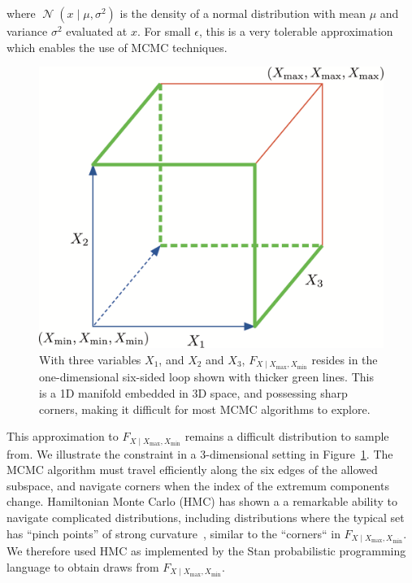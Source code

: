 \documentclass[letter]{article}
\makeatletter
\def\maxwidth{\ifdim\Gin@nat@width>\linewidth\linewidth
\else\Gin@nat@width\fi}
\let\Oldincludegraphics\includegraphics
\renewcommand{\includegraphics}[1]{\Oldincludegraphics[width=.8\maxwidth]{#1}}
\newcommand{\genericdel}[3]{%
      \left#1#3\right#2
    }
\newcommand{\del}[1]{\genericdel(){#1}}
\DeclareMathOperator{\normal}{\mathcal{N}}
\newcommand{\Xmax}{X_{\max}}
\newcommand{\Xmin}{X_{\min}}
\newcommand{\Fcond}{F_{X \mid \Xmax,\Xmin}}
\renewcommand{\cite}[1]{\citep{#1}}
\makeatother
\begin{document}
where \(\normal\del{x \mid \mu, \sigma^2}\) is the density of a normal distribution with mean \(\mu\) and variance \(\sigma^2\) evaluated at \(x\).
For small \(\epsilon\), this is a very tolerable approximation which enables the use of MCMC techniques.
    


        \begin{figure}
\centering
\includegraphics{figures/constraints3d.png}
\caption{\label{fig:constraints3d}
With three variables \(X_1\), and \(X_2\) and \(X_3\), \(\Fcond\) resides in the one-dimensional six-sided loop shown with thicker green lines. This is a 1D manifold embedded in 3D space, and possessing sharp corners, making it difficult for most MCMC algorithms to explore.}
\end{figure}

This approximation to \(\Fcond\) remains a difficult distribution to sample from.
We illustrate the constraint in a 3-dimensional setting in Figure~\ref{fig:constraints3d}.
The MCMC algorithm must travel efficiently along the six edges of the allowed subspace,
and navigate corners when the index of the extremum components change.
Hamiltonian Monte Carlo (HMC) has shown a a remarkable ability to navigate complicated distributions, including distributions where the typical set has ``pinch points'' of strong
curvature~\cite{betancourt2017conceptual}, similar to the ``corners`` in \(\Fcond\).
We therefore used HMC as implemented by the Stan probabilistic programming language \cite{stancite} to obtain draws from \(\Fcond\).
    
\end{document}
